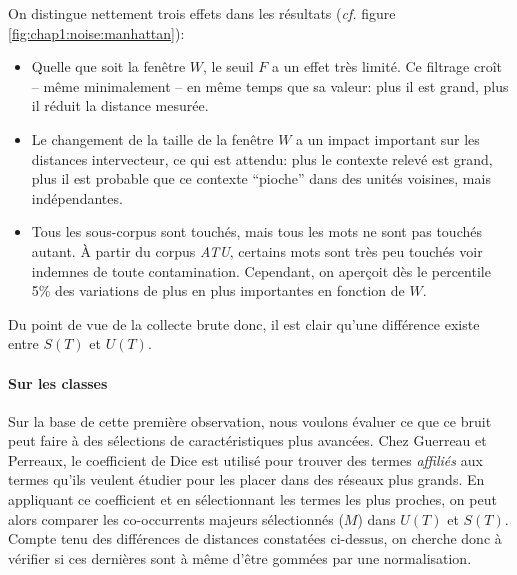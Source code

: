 On distingue nettement trois effets dans les résultats (\textit{cf.} figure \ref{fig:chap1:noise:manhattan}):
\begin{itemize}
    \item Quelle que soit la fenêtre $W$, le seuil $F$ a un effet très limité. Ce filtrage croît -- même minimalement -- en même temps que sa valeur: plus il est grand, plus il réduit la distance mesurée.
    \item Le changement de la taille de la fenêtre $W$ a un impact important sur les distances intervecteur, ce qui est attendu: plus le contexte relevé est grand, plus il est probable que ce contexte \enquote{pioche} dans des unités voisines, mais indépendantes.
    \item Tous les sous-corpus sont touchés, mais tous les mots ne sont pas touchés autant. À partir du corpus \textit{ATU}, certains mots sont très peu touchés voir indemnes de toute contamination. Cependant, on aperçoit dès le percentile 5\% des variations de plus en plus importantes en fonction de $W$.
\end{itemize}

Du point de vue de la collecte brute donc, il est clair qu'une différence existe entre $S(T)$ et $U(T)$.

\paragraph{Sur les classes}
\label{sub:major-co-occurrences}

Sur la base de cette première observation, nous voulons évaluer ce que ce bruit peut faire à des sélections de caractéristiques plus avancées. Chez Guerreau et Perreaux, le coefficient de Dice est utilisé pour trouver des termes \textit{affiliés} aux termes qu'ils veulent étudier pour les placer dans des réseaux plus grands. En appliquant ce coefficient et en sélectionnant les termes les plus proches, on peut alors comparer les co-occurrents majeurs sélectionnés ($M$) dans $U(T)$ et $S(T)$. Compte tenu des différences de distances constatées ci-dessus, on cherche donc à vérifier si ces dernières sont à même d'être gommées par une normalisation. 

